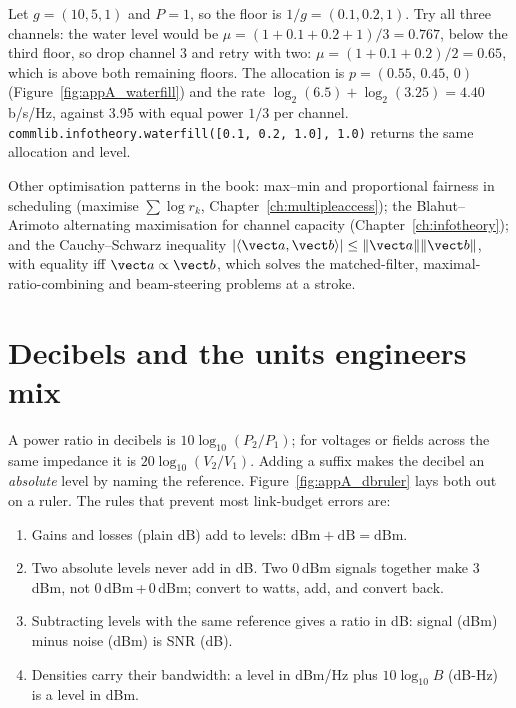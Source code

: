 
\begin{worked}
Let $g=(10,5,1)$ and $P=1$, so the floor is $1/g=(0.1,0.2,1)$. Try all three channels: the water
level would be $\mu=(1+0.1+0.2+1)/3=0.767$, below the third floor, so drop channel 3 and retry
with two: $\mu=(1+0.1+0.2)/2=0.65$, which is above both remaining floors. The allocation is
$p=(0.55,\,0.45,\,0)$ (Figure~\ref{fig:appA_waterfill}) and the rate
$\log_2(6.5)+\log_2(3.25)=4.40$\,b/s/Hz, against 3.95 with equal power $1/3$ per channel.
\texttt{commlib.infotheory.waterfill([0.1, 0.2, 1.0], 1.0)} returns the same allocation and level.
\end{worked}

Other optimisation patterns in the book: max--min and proportional fairness in scheduling
(maximise $\sum\log r_k$, Chapter~\ref{ch:multipleaccess}); the Blahut--Arimoto alternating
maximisation for channel capacity (Chapter~\ref{ch:infotheory}); and the Cauchy--Schwarz
inequality $|\langle\vect a,\vect b\rangle|\le\|\vect a\|\|\vect b\|$, with equality iff
$\vect a\propto\vect b$, which solves the matched-filter, maximal-ratio-combining and
beam-steering problems at a stroke.

\section{Decibels and the units engineers mix}
\label{sec:appA:db}

A power ratio in decibels is $10\log_{10}(P_2/P_1)$; for voltages or fields across the same
impedance it is $20\log_{10}(V_2/V_1)$. Adding a suffix makes the decibel an \emph{absolute}
level by naming the reference. Figure~\ref{fig:appA_dbruler} lays both out on a ruler. The rules
that prevent most link-budget errors are:
\begin{enumerate}[leftmargin=1.5em,itemsep=2pt]
\item Gains and losses (plain dB) add to levels: $\mathrm{dBm}+\mathrm{dB}=\mathrm{dBm}$.
\item Two absolute levels never add in dB. Two 0\,dBm signals together make 3\,dBm, not
0\,dBm\,+\,0\,dBm; convert to watts, add, and convert back.
\item Subtracting levels with the same reference gives a ratio in dB: signal (dBm) minus noise
(dBm) is SNR (dB).
\item Densities carry their bandwidth: a level in dBm/Hz plus $10\log_{10}B$ (dB-Hz) is a level in dBm.
\end{enumerate}

